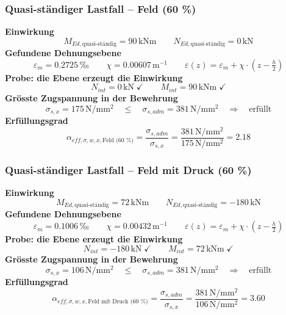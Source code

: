 \documentclass[11pt,a4paper]{article}
\begin{document}
\subsubsection{Quasi-ständiger Lastfall – Feld (60 \%)}
\noindent\textbf{Einwirkung}
\begin{equation*}
M_{Ed,\text{quasi-ständig}} = 90\,\mathrm{kNm} \qquad N_{Ed,\text{quasi-ständig}} = 0\,\mathrm{kN}
\end{equation*}
\noindent\textbf{Gefundene Dehnungsebene}
\begin{equation*}
\varepsilon_m = 0.2725\,\text{‰} \qquad \chi = 0.00607\,\mathrm{m}^{-1} \qquad \varepsilon(z) = \varepsilon_m + \chi \cdot \left(z - \tfrac{h}{2}\right)
\end{equation*}
\noindent\textbf{Probe: die Ebene erzeugt die Einwirkung}
\begin{equation*}
N_{int} = 0\,\mathrm{kN} \;\checkmark \qquad M_{int} = 90\,\mathrm{kNm} \;\checkmark
\end{equation*}
\noindent\textbf{Grösste Zugspannung in der Bewehrung}
\begin{equation*}
\sigma_{s,x} = 175\,\mathrm{N}/\mathrm{mm}^{2} \quad \le \quad \sigma_{s,adm} = 381\,\mathrm{N}/\mathrm{mm}^{2} \quad \Rightarrow \quad \text{erfüllt}
\end{equation*}
\noindent\textbf{Erfüllungsgrad}
\begin{equation*}
\alpha_{eff,\sigma,w,x,\text{Feld (60 \%)}} = \frac{\sigma_{s,adm}}{\sigma_{s,x}} = \frac{381\,\mathrm{N}/\mathrm{mm}^{2}}{175\,\mathrm{N}/\mathrm{mm}^{2}} = 2.18
\end{equation*}
\subsubsection{Quasi-ständiger Lastfall – Feld mit Druck (60 \%)}
\noindent\textbf{Einwirkung}
\begin{equation*}
M_{Ed,\text{quasi-ständig}} = 72\,\mathrm{kNm} \qquad N_{Ed,\text{quasi-ständig}} = -180\,\mathrm{kN}
\end{equation*}
\noindent\textbf{Gefundene Dehnungsebene}
\begin{equation*}
\varepsilon_m = 0.1006\,\text{‰} \qquad \chi = 0.00432\,\mathrm{m}^{-1} \qquad \varepsilon(z) = \varepsilon_m + \chi \cdot \left(z - \tfrac{h}{2}\right)
\end{equation*}
\noindent\textbf{Probe: die Ebene erzeugt die Einwirkung}
\begin{equation*}
N_{int} = -180\,\mathrm{kN} \;\checkmark \qquad M_{int} = 72\,\mathrm{kNm} \;\checkmark
\end{equation*}
\noindent\textbf{Grösste Zugspannung in der Bewehrung}
\begin{equation*}
\sigma_{s,x} = 106\,\mathrm{N}/\mathrm{mm}^{2} \quad \le \quad \sigma_{s,adm} = 381\,\mathrm{N}/\mathrm{mm}^{2} \quad \Rightarrow \quad \text{erfüllt}
\end{equation*}
\noindent\textbf{Erfüllungsgrad}
\begin{equation*}
\alpha_{eff,\sigma,w,x,\text{Feld mit Druck (60 \%)}} = \frac{\sigma_{s,adm}}{\sigma_{s,x}} = \frac{381\,\mathrm{N}/\mathrm{mm}^{2}}{106\,\mathrm{N}/\mathrm{mm}^{2}} = 3.60
\end{equation*}
\end{document}
